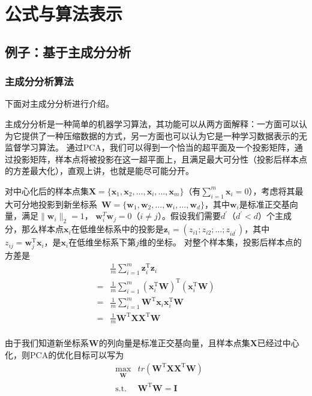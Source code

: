 \documentclass[a4paper,AutoFakeBold,oneside,12pt]{book}
\begin{document}
\section{公式与算法表示}

\subsection{例子：基于主成分分析}

\subsubsection{主成分分析算法}

下面对主成分分析进行介绍。

主成分分析是一种简单的机器学习算法，其功能可以从两方面解释：一方面可以认为它提供了一种压缩数据的方式，另一方面也可以认为它是一种学习数据表示的无监督学习算法。\cite{Goodfellow2016DeepLearning}
通过PCA，我们可以得到一个恰当的超平面及一个投影矩阵，通过投影矩阵，样本点将被投影在这一超平面上，且满足最大可分性（投影后样本点的方差最大化），直观上讲，也就是能尽可能分开。

对中心化后的样本点集$\bm{X}=\{\bm{x}_1,\bm{x}_2,\ldots,\bm{x}_i,\ldots,\bm{x}_m\}$（有$\sum_{i=1}^{m}\bm{x}_i = 0$），考虑将其最大可分地投影到新坐标系\ $\bm{W}= \{\bm{w}_1,\bm{w}_2,\ldots,\bm{w}_i,\ldots,\bm{w}_d\} $，其中$\bm{w}_i$是标准正交基向量，满足$\|\bm{w}_i\|_2 = 1$， $\bm{w}_i^T\bm{w}_j = 0$（$i \not= j$）。假设我们需要$d^\prime$（$d^\prime < d$）个主成分，那么样本点$\bm{x}_i$在低维坐标系中的投影是$\bm{z}_i = (z_{i1};z_{i2};\ldots;z_{id^\prime})$，其中$z_{ij} = \bm{w}_j^\mathrm{T}\bm{x}_i$，是$\bm{x}_i$在低维坐标系下第$j$维的坐标。
对整个样本集，投影后样本点的方差是
\begin{equation}
\begin{aligned}
    & \frac{1}{m}\sum_{i=1}^m \bm{z}_i^\mathrm{T}\bm{z}_i \\
= & \frac{1}{m}\sum_{i=1}^m (\bm{x}_i^\mathrm{T}\bm{W})^\mathrm{T}(\bm{x}_i^\mathrm{T}\bm{W}) \\
= & \frac{1}{m}\sum_{i=1}^m \bm{W}^\mathrm{T}\bm{x}_i\bm{x}_i^\mathrm{T}\bm{W} \\
= & \frac{1}{m} \bm{W}^\mathrm{T}\bm{X}\bm{X}^\mathrm{T}\bm{W} \\
\end{aligned}
\end{equation}

由于我们知道新坐标系$\bm{W}$的列向量是标准正交基向量，且样本点集$\bm{X}$已经过中心化，则PCA的优化目标可以写为
\begin{equation}
\label{PCA_goal_TMP}
\begin{aligned}
& \max_{\substack{\bm{W}}}  &  tr(\bm{W}^\mathrm{T}\bm{X}\bm{X}^ \mathrm{T}\bm{W}) \\
& \operatorname{ s.t. }  &  \bm{W}^\mathrm{T}\bm{W} = \bm{I} \\
\end{aligned}
\end{equation}
\end{document}
